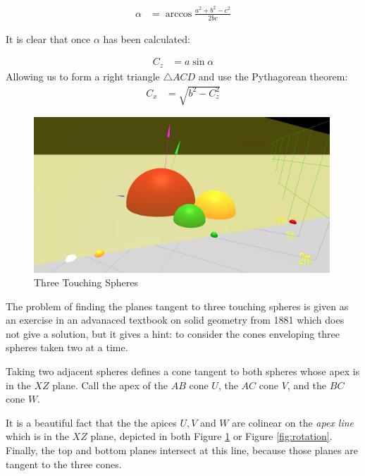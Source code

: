 \documentclass{article}
\begin{document}
\begin{align}
  \alpha  &= \arccos{\frac{a^2 + b^2 - c^2}{2bc}}
\end{align}

It is clear that once $\alpha$ has been calculated:

\begin{align}
 C_z  &= a\sin{\alpha}
\end{align}
Allowing us to form a right triangle $\triangle ACD$ and use the Pythagorean theorem:
\begin{align}
  C_x   &= \sqrt{b^2 - C_z^2}
\end{align}


\begin{figure}
     \centering
     \includegraphics[width=0.99\textwidth]{figures/StandardThreeSphereDiagram.png}
     \caption{Three Touching Spheres}
  \label{fig:fixed}
\end{figure}

The problem of finding the planes tangent to three touching spheres
is given as an exercise in an advanaced textbook on solid geometry from 1881\cite{payne1881} which does not give a solution,
but it gives a hint: to consider the cones enveloping
three spheres taken two at a time.

Taking two adjacent spheres defines a cone tangent to both spheres whose apex is in the $XZ$ plane.
Call the apex of the $AB$ cone $U$, the $AC$ cone $V$, and the $BC$ cone $W$.

It is a beautiful fact that the the apices $U,V$ and $W$ are colinear
on the {\em apex line} which is in the $XZ$ plane, depicted in both Figure \ref{fig:fixed}
or Figure \ref{fig:rotation}.
Finally, the top and bottom planes
intersect at this line, because those planes are tangent to the three cones.
\end{document}
